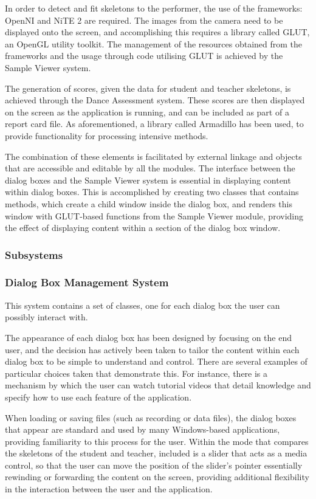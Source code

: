 \documentclass[11pt,a4paper]{article}
\begin{document}
\noindent
In order to detect and fit skeletons to the performer, the use of the frameworks: OpenNI and NiTE 2 are required. The images from the camera need to be displayed onto the screen, and accomplishing this requires a library called GLUT, an OpenGL utility toolkit. The management of the resources obtained from the frameworks and the usage through code utilising GLUT is achieved by the Sample Viewer system.

\noindent
The generation of scores, given the data for student and teacher skeletons, is achieved through the Dance Assessment system. These scores are then displayed on the screen as the application is running, and can be included as part of a report card file. As aforementioned, a library called Armadillo has been used, to provide functionality for processing intensive methods.

\noindent
The combination of these elements is facilitated by external linkage and objects that are accessible and editable by all the modules. The interface between the dialog boxes and the Sample Viewer system is essential in displaying content within dialog boxes. This is accomplished by creating two classes that contains methods, which create a child window inside the dialog box, and renders this window with GLUT-based functions from the Sample Viewer module, providing the effect of displaying content within a section of the dialog box window.

\subsubsection{Subsystems}

\subsubsection*{Dialog Box Management System}

This system contains a set of classes, one for each dialog box the user can possibly interact with.

\noindent
The appearance of each dialog box has been designed by focusing on the end user, and the decision has actively been taken to tailor the content within each dialog box to be simple to understand and control.  There are several examples of particular choices taken that demonstrate this. For instance, there is a mechanism by which the user can watch tutorial videos that detail knowledge and specify how to use each feature of the application.

\noindent
When loading or saving files (such as recording or data files), the dialog boxes that appear are standard and used by many Windows-based applications, providing familiarity to this process for the user.
Within the mode that compares the skeletons of the student and teacher, included is a slider that acts as a media control, so that the user can move the position of the slider's pointer essentially rewinding or forwarding the content on the screen, providing additional flexibility in the interaction between the user and the application.
\end{document}
